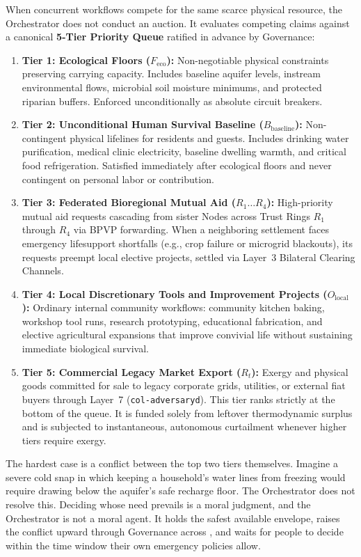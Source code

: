 When concurrent workflows compete for the same scarce physical resource, the Orchestrator does not conduct an auction. It evaluates competing claims against a canonical \textbf{5-Tier Priority Queue} ratified in advance by Governance:
\begin{enumerate}
  \item \textbf{Tier 1: Ecological Floors ($F_{\mathrm{eco}}$):} Non-negotiable physical constraints preserving carrying capacity. Includes baseline aquifer levels, instream environmental flows, microbial soil moisture minimums, and protected riparian buffers. Enforced unconditionally as absolute circuit breakers.
  \item \textbf{Tier 2: Unconditional Human Survival Baseline ($B_{\mathrm{baseline}}$):} Non-contingent physical lifelines for residents and guests. Includes drinking water purification, medical clinic electricity, baseline dwelling warmth, and critical food refrigeration. Satisfied immediately after ecological floors and never contingent on personal labor or contribution.
  \item \textbf{Tier 3: Federated Bioregional Mutual Aid ($R_1 \dots R_4$):} High-priority mutual aid requests cascading from sister Nodes across Trust Rings $R_1$ through $R_4$ via BPVP forwarding. When a neighboring settlement faces emergency lifesupport shortfalls (e.g., crop failure or microgrid blackouts), its requests preempt local elective projects, settled via Layer~3 Bilateral Clearing Channels.
  \item \textbf{Tier 4: Local Discretionary Tools and Improvement Projects ($O_{\mathrm{local}}$):} Ordinary internal community workflows: community kitchen baking, workshop tool runs, research prototyping, educational fabrication, and elective agricultural expansions that improve convivial life without sustaining immediate biological survival.
  \item \textbf{Tier 5: Commercial Legacy Market Export ($R_t$):} Exergy and physical goods committed for sale to legacy corporate grids, utilities, or external fiat buyers through Layer~7 (\texttt{col-adversaryd}). This tier ranks strictly at the bottom of the queue. It is funded solely from leftover thermodynamic surplus and is subjected to instantaneous, autonomous curtailment whenever higher tiers require exergy.
\end{enumerate}

The hardest case is a conflict between the top two tiers themselves. Imagine a severe cold snap in which keeping a household's water lines from freezing would require drawing below the aquifer's safe recharge floor. The Orchestrator does not resolve this. Deciding whose need prevails is a moral judgment, and the Orchestrator is not a moral agent. It holds the safest available envelope, raises the conflict upward through Governance across , and waits for people to decide within the time window their own emergency policies allow.

